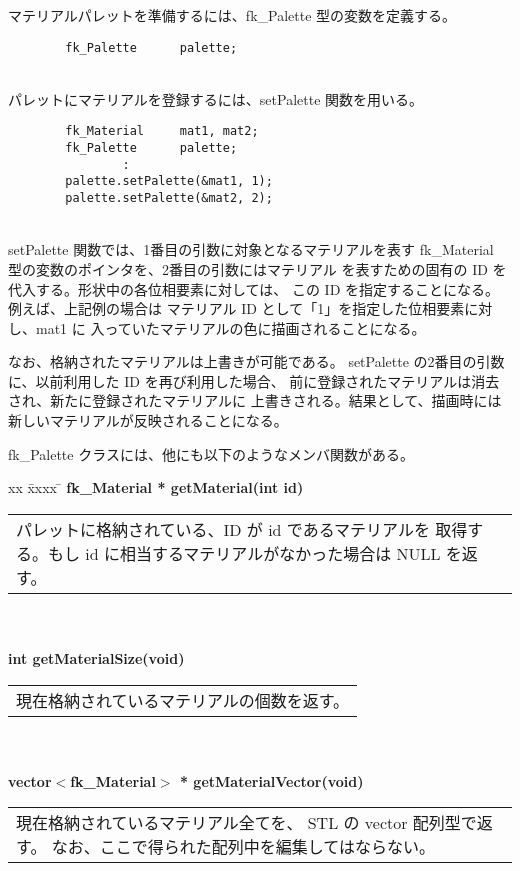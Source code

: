 マテリアルパレットを準備するには、fk\_Palette 型の変数を定義する。
\\
\begin{screen}
\begin{verbatim}
        fk_Palette      palette;
\end{verbatim}
\end{screen}
~ \\
パレットにマテリアルを登録するには、setPalette 関数を用いる。
\\
\begin{screen}
\begin{verbatim}
        fk_Material     mat1, mat2;
        fk_Palette      palette;
                :
        palette.setPalette(&mat1, 1);
        palette.setPalette(&mat2, 2);
\end{verbatim}
\end{screen}
~ \\
setPalette 関数では、1番目の引数に対象となるマテリアルを表す
fk\_Material 型の変数のポインタを、2番目の引数にはマテリアル
を表すための固有の ID を代入する。形状中の各位相要素に対しては、
この ID を指定することになる。例えば、上記例の場合は
マテリアル ID として「1」を指定した位相要素に対し、mat1 に
入っていたマテリアルの色に描画されることになる。

なお、格納されたマテリアルは上書きが可能である。
setPalette の2番目の引数に、以前利用した ID を再び利用した場合、
前に登録されたマテリアルは消去され、新たに登録されたマテリアルに
上書きされる。結果として、描画時には新しいマテリアルが反映されることになる。

fk\_Palette クラスには、他にも以下のようなメンバ関数がある。
\begin{tabbing}
xx \= xxxx \= \kill
\> \textbf{fk\_Material * getMaterial(int id)} \\
	\> \> \begin{tabular}{p{15cm}}
		パレットに格納されている、ID が id であるマテリアルを
		取得する。もし id に相当するマテリアルがなかった場合は
		NULL を返す。
	\end{tabular} \\ \\

\> \textbf{int getMaterialSize(void)} \\
	\> \> \begin{tabular}{p{15cm}}
		現在格納されているマテリアルの個数を返す。
	\end{tabular} \\ \\

\> \textbf{vector\(<\)fk\_Material\(>\) * getMaterialVector(void)} \\
	\> \> \begin{tabular}{p{15cm}}
		現在格納されているマテリアル全てを、
		STL の vector 配列型で返す。
		なお、ここで得られた配列中を編集してはならない。
	\end{tabular} \\ \\
\end{tabbing}

